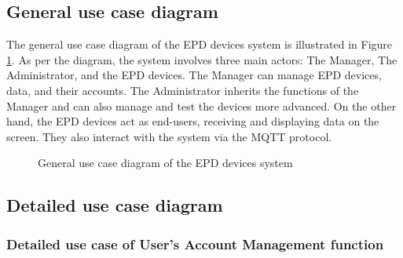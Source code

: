 \documentclass[../Main.tex]{subfiles}
\begin{document}
\subsection{General use case diagram}
\label{subsection:2.2.1}
The general use case diagram of the \gls{EPD} devices system is illustrated in Figure \ref{fig:uc_general}. As per the diagram, the system involves three main actors: The Manager, The Administrator, and the \gls{EPD} devices. The Manager can manage \gls{EPD} devices, data, and their accounts. The Administrator inherits the functions of the Manager and can also manage and test the devices more advanced. On the other hand, the \gls{EPD} devices act as end-users, receiving and displaying data on the screen. They also interact with the system via the MQTT protocol.
\begin{figure}[H]
    \centering
    \caption{General use case diagram of the \gls{EPD} devices system}
    \label{fig:uc_general}
\end{figure}

\subsection{Detailed use case diagram}
\label{subsection:2.2.2}

\subsubsection{Detailed use case of User's Account Management function}
\end{document}
